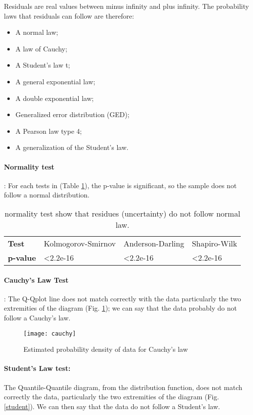 Residuals are real values between minus infinity and plus infinity. The probability laws that residuals can follow are therefore:

\begin{itemize}
\item A normal law;
\item A law of Cauchy;
\item A Student's law t;
\item A general exponential law;
\item A double exponential law;
\item Generalized error distribution (GED);
\item A Pearson law type 4;
\item A generalization of the Student's law.
\end{itemize}


\paragraph{Normality test}:
For each tests in (Table \ref{normal}), the p-value is significant, so the sample does not follow a normal distribution.

\begin{table}[h]
\centering
\caption{normality test show that residues (uncertainty) do not follow normal law.}
\label{normal}
\begin{tabular}{llll}
\textbf{Test}    & Kolmogorov-Smirnov & Anderson-Darling  & Shapiro-Wilk      \\
\textbf{p-value} & \textless 2.2e-16  & \textless 2.2e-16 & \textless 2.2e-16
\end{tabular}
\end{table}

\paragraph{Cauchy's Law Test}: The Q-Qplot line does not match correctly with the data particularly the two extremities of the diagram (Fig. \ref{cauchy}); we can say that the data probably do not follow a Cauchy's law.

\begin{figure}[h]
\centering
\texttt{[image: cauchy]}
\caption{Estimated probability density of data for Cauchy's law}
\label{cauchy}
\end{figure}

\paragraph{Student's Law test:} The Quantile-Quantile diagram, from the distribution function, does not match correctly the data, particularly the two extremities of the diagram (Fig. \ref{student}). We can then say that the data do not follow a Student's law.

